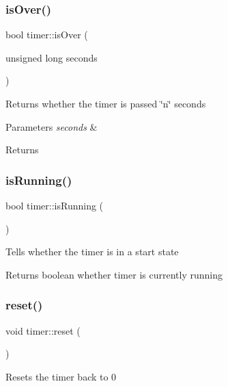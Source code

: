 \subsubsection{\texorpdfstring{isOver()}{isOver()}}
{\footnotesize\ttfamily bool timer\+::is\+Over (\begin{DoxyParamCaption}\item[{unsigned long}]{seconds }\end{DoxyParamCaption})}

Returns whether the timer is passed \char`\"{}n\char`\"{} seconds 
\begin{DoxyParams}{Parameters}
{\em seconds} & \\
\hline
\end{DoxyParams}
\begin{DoxyReturn}{Returns}

\end{DoxyReturn}
\mbox{\label{classtimer_a8dae71cac9d8c9e07364793e9f7dfa18}} 
\subsubsection{\texorpdfstring{isRunning()}{isRunning()}}
{\footnotesize\ttfamily bool timer\+::is\+Running (\begin{DoxyParamCaption}{ }\end{DoxyParamCaption})}

Tells whether the timer is in a start state \begin{DoxyReturn}{Returns}
boolean whether timer is currently running 
\end{DoxyReturn}
\mbox{\label{classtimer_a66fc54d1f33bd9d4bec5f8d563595c2e}} 
\subsubsection{\texorpdfstring{reset()}{reset()}}
{\footnotesize\ttfamily void timer\+::reset (\begin{DoxyParamCaption}{ }\end{DoxyParamCaption})}

Resets the timer back to 0 \mbox{\label{classtimer_a9aa894a57748b2bdf3adce46f5736794}} 

